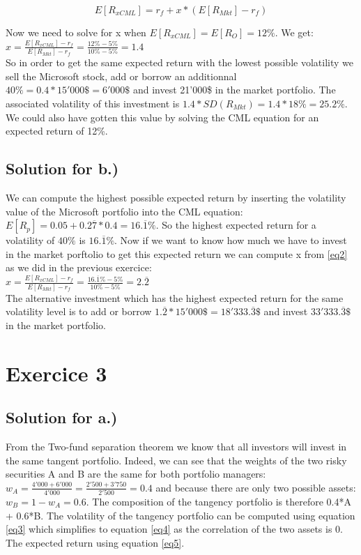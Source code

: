 \documentclass[a4paper,11pt,twoside]{article}
\begin{document}
\begin{equation}
\label{eq2}
E[R_{xCML}] = r_f + x*(E[R_{Mkt}] -r_f)
\end{equation}

Now we need to solve for x when $E[R_{xCML}] = E[R_O] = 12\% $. We get: \\ $x = \frac{E[R_{xCML}]-r_f}{E[R_{Mkt}] -r_f} = \frac{12\% - 5\%}{10\% - 5\%} = 1.4$ \\

So in order to get the same expected return with the lowest possible volatility we sell the Microsoft stock, add or borrow an additionnal $40\% = 0.4*15'000\$ = 6'000\$ $ and invest 21'000\$ in the market portfolio. The associated volatility of this investment is $1.4*SD(R_{Mkt}) = 1.4*18\% = 25.2\% $. We could also have gotten this value by solving the CML equation for an expected return of 12\%.

\subsection{Solution for b.)}
We can compute the highest possible expected return by inserting the volatility value of the Microsoft portfolio into the CML equation: $ E[R_p] = 0.05+0.2\overline{7}*0.4 = 16.\overline{1}\% $. So the highest expected return for a volatility of $40\%$ is $16.\overline{1}\% $. Now if we want to know how much we have to invest in the market porftolio to get this expected return we can compute x from \ref{eq2} as we did in the previous exercice: \\
$x = \frac{E[R_{xCML}]-r_f}{E[R_{Mkt}] -r_f} = \frac{16.\overline{1}\% - 5\%}{10\% - 5\%} = 2.\overline{2}$ \\ The alternative investment which has the highest expected return for the same volatility level is to add or borrow $1.\overline{2} * 15'000\$ = 18'333.\overline{3}\$ $ and invest $33'333.\overline{3}\$ $ in the market portfolio.



\section{Exercice 3}

\subsection{Solution for a.)}

From the Two-fund separation theorem we know that all investors will invest in the same tangent portfolio. Indeed, we can see that the weights of the two risky securities A and B are the same for both portfolio managers: $w_A = \frac{4'000+6'000}{4'000} = \frac{2'500+3'750}{2'500} = 0.4$ and because there are only two possible assets: $w_B = 1-w_A = 0.6$. The composition of the tangency portfolio is therefore 0.4*A + 0.6*B. The volatility of the tangency portfolio can be computed using equation \ref{eq3} which simplifies to equation \ref{eq4} as the correlation of the two assets is 0. The expected return using equation \ref{eq5}. 
\end{document}
